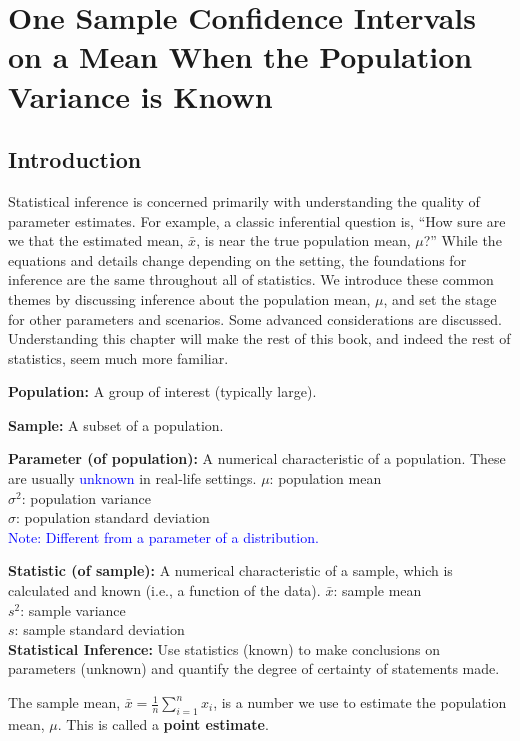 \chapter{One Sample Confidence Intervals on a Mean When the Population Variance is Known}
\section{Introduction}
Statistical inference is concerned primarily with understanding the quality of parameter estimates. For example, a classic inferential question is, ``How sure are we that the estimated mean, $\bar{x}$, is near the true population mean, $\mu$?'' While the equations and details change depending on the setting, the foundations for inference are the same throughout all of statistics. We introduce these common themes by discussing inference about the population mean, $\mu$, and set the stage for other parameters and scenarios. Some advanced considerations are discussed. Understanding this chapter will make the rest of this book, and indeed the rest of statistics, seem much more familiar.

\begin{definition}
\textbf{Population:} A group of interest (typically large). 
\vspace{0.1em}

\textbf{Sample:} A subset of a population. 

\textbf{Parameter (of population):} A numerical characteristic of a population. These are usually \textcolor{blue}{unknown} in real-life settings. 
\hspace*{1em} $\mu$: population mean \\
\hspace*{1em} $\sigma^2$: population variance \\
\hspace*{1em} $\sigma$: population standard deviation \\
\textcolor{blue}{Note: Different from a parameter of a distribution.} 

\textbf{Statistic (of sample):} A numerical characteristic of a sample, which is calculated and known (i.e., a function of the data). 
\hspace*{1em} $\bar{x}$: sample mean \\
\hspace*{1em} $s^2$: sample variance \\
\hspace*{1em} $s$: sample standard deviation \\

\textbf{Statistical Inference:} Use statistics (known) to make conclusions on parameters (unknown) and quantify the degree of certainty of statements made.

\end{definition}
\noindent
The sample mean, $\bar{x} = \frac{1}{n} \sum_{i=1}^{n} x_i$, is a number we use to estimate the population mean, $\mu$. This is called a \textbf{point estimate}. %

